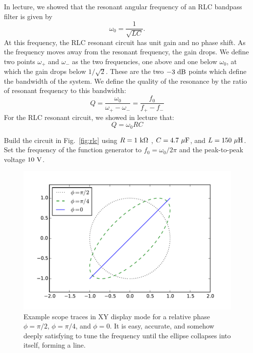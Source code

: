 \documentclass[12pt]{article}
\begin{document}
In lecture, we showed that the resonant angular frequency of an RLC bandpass filter is given by
\begin{equation}
\omega_0 = \frac{1}{\sqrt{LC}}. 
\end{equation}
At this frequency, the RLC resonant circuit has unit gain and no phase shift.  As the frequency moves away from the resonant frequency, the gain drops.  We define two points $\omega_+$ and $\omega_-$ as the two frequencies, one above and one below $\omega_0$, at which the gain drops below $1/\sqrt{2}$.  These are the two $-3~\rm dB$ points which define the bandwidth of the system.  We define the quality of the resonance by the ratio of resonant frequency to this bandwidth:
\begin{displaymath}
Q = \frac{\omega_0}{\omega_+ - \omega_-} = \frac{f_0}{f_+-f_-}
\end{displaymath}
For the RLC resonant circuit, we showed in lecture that:
\begin{equation}
Q = \omega_0 RC
\end{equation}

Build the circuit in Fig.~\ref{fig:rlc} using $R=1~{\rm k \Omega}$ , $C=4.7~\rm{\mu F}$, and $L=150~\rm \mu H$.
Set the frequency of the function generator to $f_0 = \omega_0/2\pi$  and the peak-to-peak voltage $10~\rm V$.

\begin{figure}[htbp]
\begin{center}
\includegraphics[height=0.35\textheight]{figs/scope_xy.pdf}
\end{center}
\caption{\label{fig:scopexy} Example scope traces in XY display mode for a relative phase $\phi=\pi/2$, 
$\phi=\pi/4$, and $\phi=0$.  It is easy, accurate, and somehow deeply satisfying to tune the frequency until the ellipse collapses into itself, forming a line.}
\end{figure}
\end{document}
